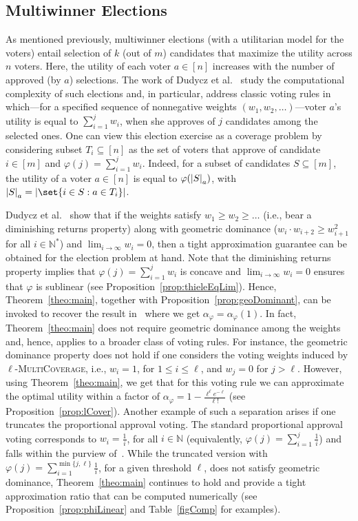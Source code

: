 \subsection{Multiwinner Elections}
\label{subsection:multiwinner-election} 
As mentioned previously, multiwinner elections (with a utilitarian model for the voters) entail selection of $k$ (out of $m$) candidates that maximize the utility across $n$ voters. Here, the utility of each voter $a \in [n]$ increases with the number of approved (by $a$) selections. 
The work of Dudycz et al.~\cite{DMMS20} study the computational complexity of such elections and, in particular, address classic voting rules in which---for a specified sequence of nonnegative weights $(w_1, w_2, \ldots)$---voter $a$'s utility is equal to $\sum_{i=1}^j w_i$, when she approves of $j$ candidates among the selected ones. One can view this election exercise as a coverage problem by considering subset $T_i \subseteq [n]$ as the set of voters that approve of candidate $i \in [m]$ and $\varphi(j) = \sum_{i=1}^j w_i$. Indeed, for a subset of candidates $S \subseteq [m]$, the utility of a voter $a \in [n]$ is equal to $\varphi ( \abs{S}_a)$, with $\abs{S}_a = \abs{\set{i \in S : a \in T_i}}$. 

Dudycz et al.~\cite{DMMS20} show that if the weights satisfy $w_1 \geq w_2 \geq \ldots$ (i.e., bear a  diminishing returns property) along with geometric dominance ($w_{i } \cdot w_{i+2} \geq w_{i+1}^2$ for all $i \in \mathbb{N}^*$) and $\lim_{i \rightarrow \infty} w_i = 0$, then a tight approximation guarantee can be obtained for the election problem at hand. Note that the diminishing returns property implies that $\varphi(j) = \sum_{i=1}^j w_i$ is concave and $\lim_{i \rightarrow \infty} w_i = 0$ ensures that $\varphi$ is sublinear (see Proposition~\ref{prop:thieleEqLim}). Hence, Theorem~\ref{theo:main}, together with Proposition~\ref{prop:geoDominant}, can be invoked to recover the result in~\cite{DMMS20} where we get $\alpha_{\varphi} = \alpha_{\varphi}(1)$. In fact, Theorem~\ref{theo:main} does not require geometric dominance among the weights and, hence, applies to a broader class of voting rules. For instance, the geometric dominance property does not hold if one considers the voting weights induced by $\ell$-\textsc{MultiCoverage}, i.e., $w_i = 1$, for $1 \leq i \leq \ell$, and $w_j = 0$ for $j > \ell$.  However, using Theorem~\ref{theo:main}, we get that for this voting rule we can approximate the optimal utility within a factor of $\alpha_\varphi = 1-\frac{\ell^{\ell}e^{-\ell}}{\ell!}$ (see Proposition~\ref{prop:lCover}). Another example of such a separation arises if one truncates the proportional approval voting. The standard proportional approval voting corresponds to $w_i = \frac{1}{i}$, for all $i \in \mathbb{N}$ (equivalently,  $\varphi(j) = \sum_{i=1}^j \frac{1}{i}$) and falls within the purview of~\cite{DMMS20}. While the truncated version with $\varphi(j) = \sum_{i=1}^{\min\{j, \ell\}} \frac{1}{i}$, for a given threshold $\ell$, does not satisfy geometric dominance, Theorem~\ref{theo:main} continues to hold and provide a tight approximation ratio that can be computed numerically (see Proposition~\ref{prop:phiLinear} and Table~\ref{figComp} for examples).

